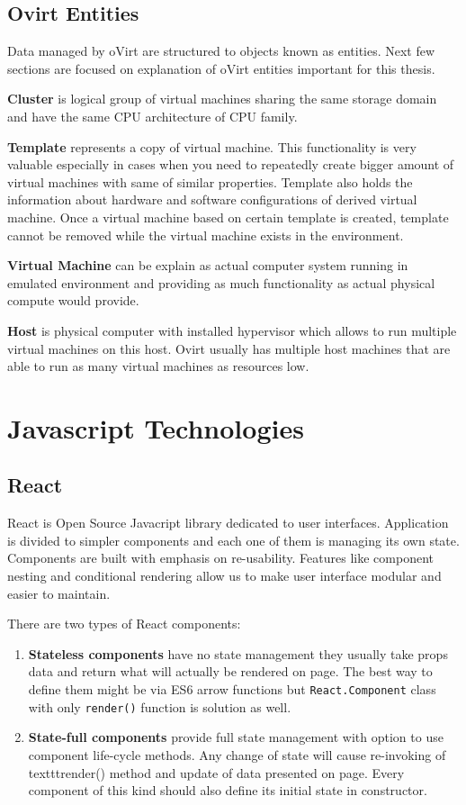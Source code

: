 \section{Ovirt Entities}
Data managed by oVirt are structured to objects known as entities. Next few sections are focused on explanation of oVirt entities important for this thesis.

\textbf{Cluster} is logical group of virtual machines sharing the same storage domain and have the same CPU architecture of CPU family.

\textbf{Template} represents a copy of virtual machine. This functionality is very valuable especially in cases when you need to repeatedly create bigger amount of virtual machines with same of similar properties. Template also holds the information about hardware and software configurations of derived virtual machine. Once a virtual machine based on certain template is created, template cannot be removed while the virtual machine exists in the environment. 

\textbf{Virtual Machine} can be explain as actual computer system running in emulated environment and providing as much functionality as actual physical compute would provide.

\textbf{Host} is physical computer with installed hypervisor which allows to run multiple virtual machines on this host. Ovirt usually has multiple host machines that are able to run as many virtual machines as resources low.


\chapter{Javascript Technologies}

\section{React}
React is Open Source Javacript library dedicated to user interfaces. Application is divided to simpler components and each one of them is managing its own state. Components are built with emphasis on re-usability. Features like component nesting and conditional rendering allow us to make user interface modular and easier to maintain.

\noident There are two types of React components:
\begin{enumerate}
\item \textbf{Stateless components} have no state management they usually take props data and return what will actually be rendered on page. The best way to define them might be via ES6 arrow functions but \texttt{React.Component} class with only \texttt{render()} function is solution as well.

\item \textbf{State-full components} provide full state management with option to use component life-cycle methods. Any change of state will cause re-invoking of texttt{render()} method and update of data presented on page. Every component of this kind should also define its initial state in constructor.
\end{enumerate}

